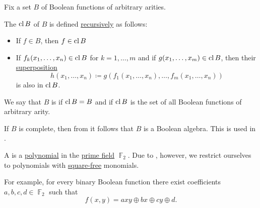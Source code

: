 \begin{definition}\label{def:boolean_closure}
  Fix a set \( B \) of Boolean functions of arbitrary arities.

  The  \( \operatorname{cl}{B} \) of \( B \) is defined \hyperref[rem:structural_recursion_and_induction]{recursively} as follows:
  \begin{itemize}
    \item If \( f \in B \), then \( f \in \operatorname{cl}{B} \)
    \item If \( f_k(x_1, \ldots, x_n) \in \operatorname{cl}{B} \) for \( k = 1, \ldots, m \) and if \( g(x_1, \ldots, x_m) \in \operatorname{cl}{B} \), then their \hyperref[def:multi_valued_function/superposition]{superposition}
    \begin{equation*}
      h(x_1, \ldots, x_n) \coloneqq g(f_1(x_1, \ldots, x_n), \ldots, f_m(x_1, \ldots, x_n))
    \end{equation*}
    is also in \( \operatorname{cl}{B} \).
  \end{itemize}

  We say that \( B \) is  if \( \operatorname{cl}{B} = B \) and  if \( \operatorname{cl}{B} \) is the set of all Boolean functions of arbitrary arity.

  If \( B \) is complete, then from  it follows that \( B \) is a Boolean algebra. This is used in .
\end{definition}

\begin{definition}\label{def:zhegalkin_polynomial}
  A  is a \hyperref[def:polynomial_semiring]{polynomial} in the \hyperref[thm:finite_fields]{prime field} \( \BbbF_2 \). Due to , however, we restrict ourselves to polynomials with \hyperref[def:square_free]{square-free} monomials.

  For example, for every binary Boolean function there exist coefficients \( a, b, c, d \in \BbbF_2 \) such that
  \begin{equation}\label{eq:def:zhegalkin_polynomial/binary_polynomial}
    f(x, y) = axy \oplus bx \oplus cy \oplus d.
  \end{equation}
\end{definition}

